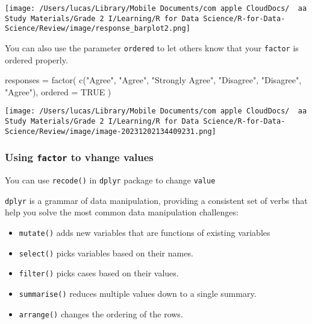 \documentclass[
]{article}
\newenvironment{Shaded}{}{}
\newcommand{\AttributeTok}[1]{\textcolor[rgb]{0.49,0.56,0.16}{#1}}
\newcommand{\ConstantTok}[1]{\textcolor[rgb]{0.53,0.00,0.00}{#1}}
\newcommand{\FunctionTok}[1]{\textcolor[rgb]{0.02,0.16,0.49}{#1}}
\newcommand{\NormalTok}[1]{#1}
\newcommand{\OtherTok}[1]{\textcolor[rgb]{0.00,0.44,0.13}{#1}}
\newcommand{\StringTok}[1]{\textcolor[rgb]{0.25,0.44,0.63}{#1}}
\begin{document}
\texttt{[image: /Users/lucas/Library/Mobile Documents/com~apple~CloudDocs/~~aa Study Materials/Grade 2 I/Learning/R for Data Science/R-for-Data-Science/Review/image/response\_barplot2.png]}

You can also use the parameter \texttt{ordered} to let others know that
your \texttt{factor} is ordered properly.

\begin{Shaded}
\begin{Highlighting}[]
\NormalTok{responses }\OtherTok{=}
  \FunctionTok{factor}\NormalTok{(}
    \FunctionTok{c}\NormalTok{(}\StringTok{"Agree"}\NormalTok{, }\StringTok{"Agree"}\NormalTok{, }\StringTok{"Strongly Agree"}\NormalTok{, }\StringTok{"Disagree"}\NormalTok{, }\StringTok{"Disagree"}\NormalTok{, }\StringTok{"Agree"}\NormalTok{),}
    \AttributeTok{ordered =} \ConstantTok{TRUE}
\NormalTok{  )}
\end{Highlighting}
\end{Shaded}

\texttt{[image: /Users/lucas/Library/Mobile Documents/com~apple~CloudDocs/~~aa Study Materials/Grade 2 I/Learning/R for Data Science/R-for-Data-Science/Review/image/image-20231202134409231.png]}

\hypertarget{using-factor-to-vhange-values}{%
\subsubsection{\texorpdfstring{Using \texttt{factor} to vhange
values}{Using factor to vhange values}}\label{using-factor-to-vhange-values}}

You can use \texttt{recode()} in \texttt{dplyr} package to change
\texttt{value}

\texttt{dplyr} is a grammar of data manipulation, providing a consistent
set of verbs that help you solve the most common data manipulation
challenges:

\begin{itemize}
\item
  \texttt{mutate()} adds new variables that are functions of existing
  variables
\item
  \texttt{select()} picks variables based on their names.
\item
  \texttt{filter()} picks cases based on their values.
\item
  \texttt{summarise()} reduces multiple values down to a single summary.
\item
  \texttt{arrange()} changes the ordering of the rows.
\end{itemize}
\end{document}
